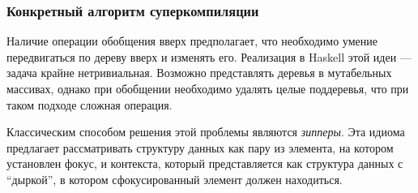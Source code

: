 




\subsubsection{Конкретный алгоритм суперкомпиляции}

Наличие операции обобщения вверх предполагает, что необходимо умение передвигаться по дереву вверх и изменять его. 
Реализация в Haskell этой идеи --- задача крайне нетривиальная. Возможно представлять
деревья в мутабельных массивах, однако при обобщении необходимо удалять целые поддеревья,
что при таком подходе сложная операция.

Классическим способом решения этой проблемы являются \emph{зипперы}\cite{zipper}.
Эта идиома предлагает рассматривать структуру данных как пару из элемента,
на котором установлен фокус, и контекста, который представляется как структура данных
с ``дыркой'', в котором сфокусированный элемент должен находиться.

